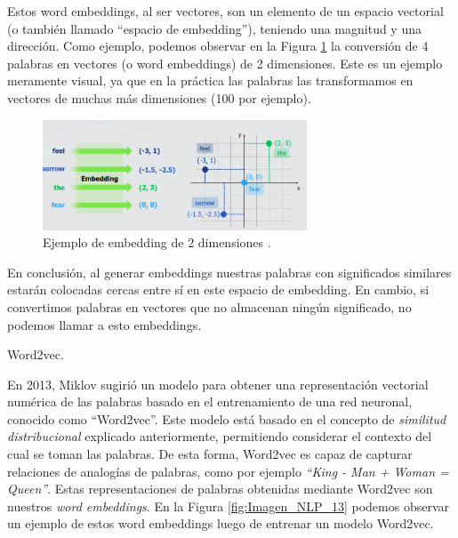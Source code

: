 \documentclass[12pt,a4paper]{article}
\makeatletter
\renewcommand\paragraph{\@startsection{paragraph}{4}{\z@}
            {-2.5ex\@plus -1ex \@minus -.25ex}
            {1.25ex \@plus .25ex}
            {\normalfont\normalsize\bfseries}}
\makeatother
\begin{document}
\begin{sloppypar}
\begin{itemize}
\end{itemize}

Estos word embeddings, al ser vectores, son un elemento de un espacio vectorial (o también llamado “espacio de embedding”), teniendo una magnitud y una dirección. Como ejemplo, podemos observar en la Figura \ref{fig:Imagen_NLP_12} la conversión de 4 palabras en vectores (o word embeddings) de 2 dimensiones. Este es un ejemplo meramente visual, ya que en la práctica las palabras las transformamos en vectores de muchas más dimensiones (100 por ejemplo). 

\begin{figure}[H]    
 \centering
 \includegraphics[width=0.7\textwidth]{images/NLP/12.png}
 \caption{ Ejemplo de embedding de 2 dimensiones \cite{NLP_28}.}
 \label{fig:Imagen_NLP_12}
\end{figure}

En conclusión, al generar embeddings nuestras palabras con significados similares estarán colocadas cercas entre sí en este espacio de embedding. En cambio, si convertimos palabras en vectores que no almacenan ningún significado, no podemos llamar a esto embeddings. 

\cleardoublepage

\paragraph{Word2vec.}\label{word2vec}

En 2013, Miklov\cite{NLP_11} sugirió un modelo para obtener una representación vectorial numérica de las palabras basado en el entrenamiento de una red neuronal, conocido como “Word2vec”. Este modelo está basado en el concepto de \textit{similitud distribucional} explicado anteriormente, permitiendo considerar el contexto del cual se toman las palabras. De esta forma, Word2vec es capaz de capturar relaciones de analogías de palabras, como por ejemplo \textit{“King - Man + Woman = Queen”}.  Estas representaciones de palabras obtenidas mediante Word2vec son nuestros \textit{word embeddings}. En la Figura \ref{fig:Imagen_NLP_13} podemos observar un ejemplo de estos word embeddings luego de entrenar un modelo Word2vec.


\end{sloppypar}
\end{document}
